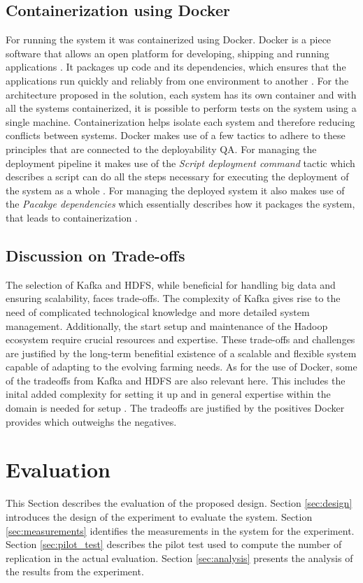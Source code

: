 \documentclass[conference]{IEEEtran}
\begin{document}
\subsection{Containerization using Docker}
For running the system it was containerized using Docker. Docker is a piece software that allows an open platform for developing, shipping and running applications \cite{Docker2022What}. It packages up code and its dependencies, which ensures that the applications run quickly and reliably from one environment to another \cite{Docker2022What}.
For the architecture proposed in the solution, each system has its own container and with all the systems containerized, it is possible to perform tests on the system using a single machine. Containerization helps isolate each system and therefore reducing conflicts between systems. Docker makes use of a few tactics to adhere to these principles that are connected to the deployability QA. For managing the deployment pipeline it makes use of the \textit{Script deployment command} tactic which describes a script can do all the steps necessary for executing the deployment of the system as a whole \cite{Bass2012Software}. For managing the deployed system it also makes use of the \textit{Pacakge dependencies} which essentially describes how it packages the system, that leads to containerization \cite{Bass2012Software}.


\subsection{Discussion on Trade-offs}
The selection of Kafka and HDFS, while beneficial for handling big data and ensuring scalability, faces trade-offs. The complexity of Kafka gives rise to the need of complicated technological knowledge and more detailed system management. Additionally, the start setup and maintenance of the Hadoop ecosystem require crucial resources and expertise. These trade-offs and challenges are justified by the long-term benefitial existence of a scalable and flexible system capable of adapting to the evolving farming needs.
As for the use of Docker, some of the tradeoffs from Kafka and HDFS are also relevant here. This includes the inital added complexity for setting it up and in general expertise within the domain is needed for setup \cite{Gover_2023}. The tradeoffs are justified by the positives Docker provides which outweighs the negatives.

\section{Evaluation}
\label{sec:evaluation}
This Section describes the evaluation of the proposed design.
Section \ref{sec:design} introduces the design of the experiment to evaluate the system.
Section \ref{sec:measurements} identifies the measurements in the system for the experiment.
Section \ref{sec:pilot_test} describes the pilot test used to compute the number of replication in the actual evaluation.
Section \ref{sec:analysis} presents the analysis of the results from the experiment.
\end{document}
